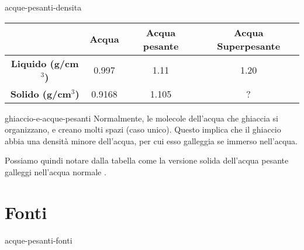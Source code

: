 \documentclass[preview]{standalone}
\begin{document}
\begin{snippet}{acque-pesanti-densita}
\begin{center}
    \bgroup{}
    \def\arraystretch{1.25}
    \begin{tabular}{ |c|c|c|c| }
        \hline
        & \textbf{Acqua} & \textbf{Acqua pesante} & \textbf{Acqua Superpesante} \\
        \hline
        \textbf{Liquido (g/cm\(^3\))} & 0.997 & 1.11 & 1.20 \\
        \hline
        \textbf{Solido (g/cm\(^3\))} & 0.9168 & 1.105 & ? \\
        \hline
    \end{tabular}
    \egroup{}
\end{center}
\phantom{ }
\end{snippet}

\begin{snippet}{ghiaccio-e-acque-pesanti}
Normalmente, le molecole dell'acqua che ghiaccia si organizzano, e creano molti spazi (caso unico).
Questo implica che il ghiaccio abbia una densità minore dell'acqua, per cui esso galleggia se immerso nell'acqua.

Possiamo quindi notare dalla tabella come la versione solida dell'acqua pesante galleggi
nell'acqua normale \cite{deuterated-water}.
\end{snippet}

\section{Fonti}

\nocite{*} %

\begin{snippet}{acque-pesanti-fonti}
\printbibliography[heading=none]
\end{snippet}
\end{document}
